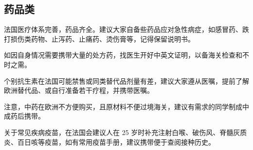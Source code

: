 \subsection{药品类}
法国医疗体系完善，药品齐全。建议大家自备些药品应对急性病症，如感冒药、跌打损伤类药物、止泻药、止痛药、烫伤膏等，记得保留说明书。

如因自身情况需要携带大量的处方药，找医生开好中英文证明，以备海关检查和不时之需。

个别抗生素在法国可能禁售或同类替代品剂量有差，建议大家遵从医嘱，提前了解欧洲替代品、或自行准备若干疗程，并携带医嘱。

注意，中药在欧洲不方便购买，且原材料不便过境海关，建议有需求的同学制成中成药后携带。

关于常见疾病疫苗，在法国会建议人在 25 岁时补充注射白喉、破伤风、脊髓灰质炎、百日咳等疫苗，如有常用疫苗手册，建议携带便于查阅接种历史。
